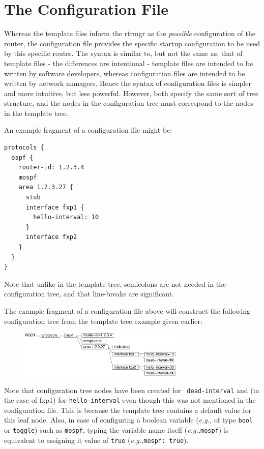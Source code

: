 \documentclass[11pt]{article}
\newcommand{\eg}{\emph{e.g.,}\xspace}
\begin{document}
\newpage

\section{The Configuration File}

Whereas the template files inform the rtrmgr as the {\it possible}
configuration of the router, the configuration file provides the
specific startup configuration to be used by this specific router.
The syntax is similar to, but not the same as, that of template files -
the differences are intentional - template files are intended to be
written by software developers, whereas configuration files are
intended to be written by network managers.  Hence the syntax of
configuration files is simpler and more intuitive, but less powerful.
However, both specify the same sort of tree structure, and the nodes
in the configuration tree must correspond to the nodes in the template
tree.

An example fragment of a configuration file might be:

\begin{verbatim}
protocols {
  ospf {
    router-id: 1.2.3.4
    mospf
    area 1.2.3.27 {
      stub
      interface fxp1 {
        hello-interval: 10
      }
      interface fxp2
    }
  }
}
\end{verbatim}

Note that unlike in the template tree, semicolons are not needed in the
configuration tree, and that line-breaks are significant.

The example fragment of a configuration file above will construct the
following configuration tree from the template tree example given
earlier:

\begin{figure}[htb]
\centerline{\includegraphics[width=0.7\textwidth]{figs/config}}
\vspace{.05in}
\end{figure}

Note that configuration tree nodes have been created for {\tt
dead-interval} and (in the case of fxp1) for {\tt hello-interval} even
though this was not mentioned in the configuration file.  This is
because the template tree contains a default value for this leaf node.
Also, in case of configuring a boolean variable (\eg of type {\tt bool} or
{\tt toggle}) such as {\tt mospf}, typing the variable name itself
(\eg \verb=mospf=) is equivalent to assigning it value of {\tt true}
(\eg \verb=mospf: true=).
\end{document}
